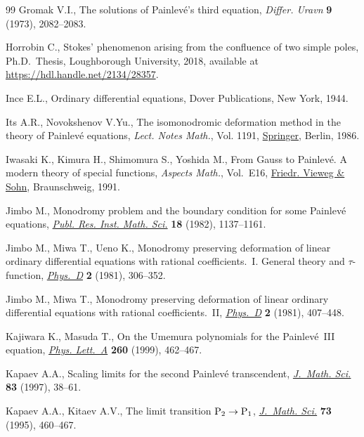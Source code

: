 \documentclass[pdftex]{sigma}
\numberwithin{equation}{section}
\begin{document}
\begin{thebibliography}{99}
Gromak V.I., The solutions of {P}ainlev\'e's third equation, \textit{Differ.
 Uravn} \textbf{9} (1973), 2082--2083.

Horrobin C., Stokes' phenomenon arising from the confluence of two simple
 poles, Ph.D.~Thesis, {L}oughborough {U}niversity, 2018, available at
 \url{https://hdl.handle.net/2134/28357}.

Ince E.L., Ordinary differential equations, Dover Publications, New York, 1944.

Its A.R., Novokshenov V.Yu., The isomonodromic deformation method in the theory
 of {P}ainlev\'e equations, \textit{Lect. Notes Math.}, Vol. 1191, \href{https://doi.org/10.1007/BFb0076661}{Springer},
 Berlin, 1986.

Iwasaki K., Kimura H., Shimomura S., Yoshida M., From {G}auss to {P}ainlev\'e.
 {A} modern theory of special functions, \textit{Aspects Math.}, Vol.~E16, \href{https://doi.org/10.1007/978-3-322-90163-7}{Friedr. Vieweg \& Sohn}, Braunschweig, 1991.

Jimbo M., Monodromy problem and the boundary condition for some {P}ainlev\'e
 equations, \href{https://doi.org/10.2977/prims/1195183300}{\textit{Publ. Res. Inst. Math. Sci.}} \textbf{18} (1982),
 1137--1161.

Jimbo M., Miwa T., Ueno K., Monodromy preserving deformation of linear ordinary
 differential equations with rational coefficients.~{I}. {G}eneral theory and
 {$\tau $}-function, \href{https://doi.org/10.1016/0167-2789(81)90013-0}{\textit{Phys.~D}} \textbf{2} (1981), 306--352.

Jimbo M., Miwa T., Monodromy preserving deformation of linear ordinary
 differential equations with rational coefficients.~{II}, \href{https://doi.org/10.1016/0167-2789(81)90021-X}{\textit{Phys.~D}}
 \textbf{2} (1981), 407--448.

Kajiwara K., Masuda T., On the {U}memura polynomials for the {P}ainlev\'e~{III}
 equation, \href{https://doi.org/10.1016/S0375-9601(99)00577-0}{\textit{Phys. Lett.~A}} \textbf{260} (1999), 462--467.

Kapaev A.A., Scaling limits for the second {P}ainlev\'e transcendent,
 \href{https://doi.org/10.1007/BF02398460}{\textit{J.~Math. Sci.}} \textbf{83} (1997), 38--61.

Kapaev A.A., Kitaev A.V., The limit transition {${\rm P}_2\to{\rm P}_1$},
 \href{https://doi.org/10.1007/BF02364568}{\textit{J.~Math. Sci.}} \textbf{73} (1995), 460--467.


\end{thebibliography}
\end{document}
